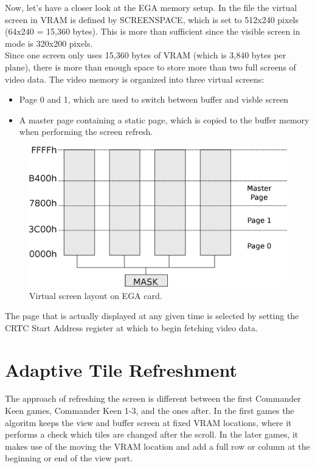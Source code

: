 \documentclass[book.tex]{subfiles}
\begin{document}
Now, let's have a closer look at the EGA memory setup. In the file  the virtual screen in VRAM is defined by SCREENSPACE, which is set to 512x240 pixels (64x240 = 15,360 bytes). This is more than sufficient since the visible screen in mode  is 320x200 pixels.\\

Since one screen only uses 15,360 bytes of VRAM (which is 3,840 bytes per plane), there is more than enough space to store more than two full screens of video data. The video memory is organized into three virtual screens:
\begin{itemize}
\item Page 0 and 1, which are used to switch between buffer and visble screen
\item A master page containing a static page, which is copied to the buffer memory when performing the screen refresh.
\end{itemize}
\par

\begin{figure}[H]
\centering
\includegraphics[width=\textwidth]{imgs/drawings/ega_ram_architecture.eps}
\caption{Virtual screen layout on EGA card.}
\label{fig:ega_ram_arch}
\end{figure}

The page that is actually displayed at any given time is selected by setting the CRTC Start Address register at which to begin fetching video data.\\


\section{Adaptive Tile Refreshment}
The approach of refreshing the screen is different between the first Commander Keen games, Commander Keen 1-3, and the ones after. In the first games the algoritm keeps the view and buffer screen at fixed VRAM locations, where it performs a check which tiles are changed after the scroll. In the later games, it makes use of the moving the VRAM location and add a full row or column at the beginning or end of the view port. \\
\end{document}
